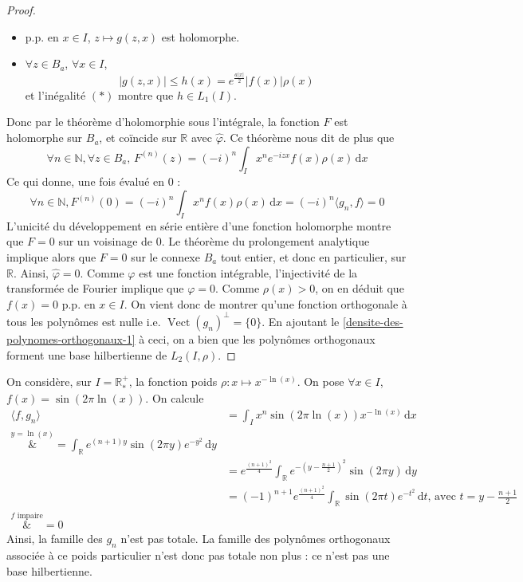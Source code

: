 \begin{proof}
\begin{itemize}
			\item p.p. en $x \in I$, $z \mapsto g(z, x)$ est holomorphe.
			\item $\forall z \in B_a$, $\forall x \in I$,
			\[ \vert g(z, x) \vert \leq h(x) = e^{\frac{a \vert x \vert}{2}} \vert f(x) \vert \rho(x) \]
			et l'inégalité $(*)$ montre que $h \in L_1(I)$.
		\end{itemize}
		Donc par le théorème d'holomorphie sous l'intégrale, la fonction $F$ est holomorphe sur $B_a$, et coïncide sur $\mathbb{R}$ avec $\widehat{\varphi}$.
		Ce théorème nous dit de plus que
		\[ \forall n \in \mathbb{N}, \forall z \in B_a, \, F^{(n)}(z) = (-i)^n \int_I x^n e^{-izx} f(x) \rho(x) \, \mathrm{d}x \]
		Ce qui donne, une fois évalué en $0$ :
		\[ \forall n \in \mathbb{N}, F^{(n)}(0) = (-i)^n \int_I x^n f(x) \rho(x) \, \mathrm{d}x = (-i)^n \langle g_n, f \rangle = 0 \]
		L'unicité du développement en série entière d'une fonction holomorphe montre que $F = 0$ sur un voisinage de $0$. Le théorème du prolongement analytique implique alors que $F = 0$ sur le connexe $B_a$ tout entier, et donc en particulier, sur $\mathbb{R}$. Ainsi, $\widehat{\varphi} = 0$. Comme $\varphi$ est une fonction intégrable, l'injectivité de la transformée de Fourier implique que $\varphi = 0$. Comme $\rho(x) > 0$, on en déduit que $f(x) = 0$ p.p. en $x \in I$. On vient donc de montrer qu'une fonction orthogonale à tous les polynômes est nulle i.e. $\operatorname{Vect}(g_n)^\perp = \{ 0 \}$.
		En ajoutant le \cref{densite-des-polynomes-orthogonaux-1} à ceci, on a bien que les polynômes orthogonaux forment une base hilbertienne de $L_2(I, \rho)$.
	\end{proof}

	\begin{cexample}
		On considère, sur $I = \mathbb{R}^+_*$, la fonction poids $\rho : x \mapsto x^{-\ln(x)}$. On pose $\forall x \in I$, $f(x) = \sin(2 \pi \ln(x))$. On calcule
		\begin{align*}
			\langle f, g_n \rangle &= \int_I x^n \sin(2\pi \ln(x)) x^{-\ln(x)} \, \mathrm{d}x \\
			\overset{y = \ln(x)}&{=} \int_{\mathbb{R}} e^{(n+1)y} \sin(2 \pi y) e^{-y^2} \, \mathrm{d}y \\
			&= e^{\frac{(n+1)^2}{4}} \int_{\mathbb{R}} e^{- \left (y - \frac{n+1}{2} \right)^2} \sin(2 \pi y) \, \mathrm{d}y \\
			&= (-1)^{n+1} e^{\frac{(n+1)^2}{4}} \int_{\mathbb{R}} \sin(2 \pi t) e^{-t^2} \, \mathrm{d}t \text{, avec } t = y - \frac{n+1}{2} \\
			\overset{f \text{ impaire}}&{=} 0
		\end{align*}
		Ainsi, la famille des $g_n$ n'est pas totale. La famille des polynômes orthogonaux associée à ce poids particulier n'est donc pas totale non plus : ce n'est pas une base hilbertienne.
	\end{cexample}

